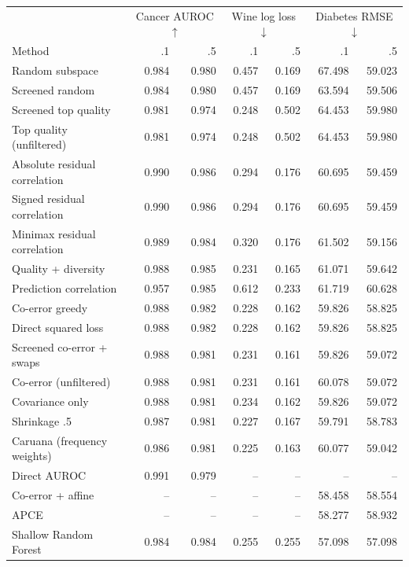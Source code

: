 \begin{table}[p]
\centering\small
\begin{tabular}{lrrrrrr}
\toprule
 & \multicolumn{2}{c}{Cancer AUROC $\uparrow$} & \multicolumn{2}{c}{Wine log loss $\downarrow$} & \multicolumn{2}{c}{Diabetes RMSE $\downarrow$} \\
Method & .1 & .5 & .1 & .5 & .1 & .5 \\
\midrule
Random subspace & 0.984 & 0.980 & 0.457 & 0.169 & 67.498 & 59.023 \\
Screened random & 0.984 & 0.980 & 0.457 & 0.169 & 63.594 & 59.506 \\
Screened top quality & 0.981 & 0.974 & 0.248 & 0.502 & 64.453 & 59.980 \\
Top quality (unfiltered) & 0.981 & 0.974 & 0.248 & 0.502 & 64.453 & 59.980 \\
Absolute residual correlation & 0.990 & 0.986 & 0.294 & 0.176 & 60.695 & 59.459 \\
Signed residual correlation & 0.990 & 0.986 & 0.294 & 0.176 & 60.695 & 59.459 \\
Minimax residual correlation & 0.989 & 0.984 & 0.320 & 0.176 & 61.502 & 59.156 \\
Quality + diversity & 0.988 & 0.985 & 0.231 & 0.165 & 61.071 & 59.642 \\
Prediction correlation & 0.957 & 0.985 & 0.612 & 0.233 & 61.719 & 60.628 \\
Co-error greedy & 0.988 & 0.982 & 0.228 & 0.162 & 59.826 & 58.825 \\
Direct squared loss & 0.988 & 0.982 & 0.228 & 0.162 & 59.826 & 58.825 \\
Screened co-error + swaps & 0.988 & 0.981 & 0.231 & 0.161 & 59.826 & 59.072 \\
Co-error (unfiltered) & 0.988 & 0.981 & 0.231 & 0.161 & 60.078 & 59.072 \\
Covariance only & 0.988 & 0.981 & 0.234 & 0.162 & 59.826 & 59.072 \\
Shrinkage .5 & 0.987 & 0.981 & 0.227 & 0.167 & 59.791 & 58.783 \\
Caruana (frequency weights) & 0.986 & 0.981 & 0.225 & 0.163 & 60.077 & 59.042 \\
Direct AUROC & 0.991 & 0.979 & -- & -- & -- & -- \\
Co-error + affine & -- & -- & -- & -- & 58.458 & 58.554 \\
APCE & -- & -- & -- & -- & 58.277 & 58.932 \\
\midrule
Shallow Random Forest & 0.984 & 0.984 & 0.255 & 0.255 & 57.098 & 57.098 \\

\end{tabular}
\end{table}
